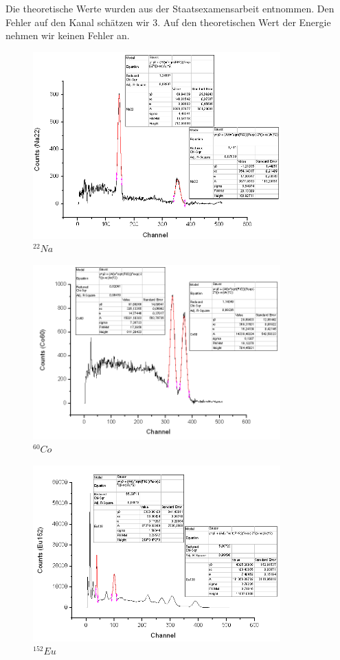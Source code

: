 Die theoretische Werte wurden aus der Staatsexamensarbeit entnommen. Den Fehler auf den Kanal schätzen wir 3. Auf den theoretischen Wert der Energie nehmen wir keinen Fehler an. %

\begin{figure}[H]
\centering \includegraphics[width = 0.85\textwidth]{auswertung/Na22.png}
\caption{$^{22}Na$}
\end{figure}

\begin{figure}[H]
\centering \includegraphics[width = 0.85\textwidth]{auswertung/Co60.png}
\caption{$^{60}Co$}
\end{figure}

\begin{figure}[H]
\centering \includegraphics[width = 0.85\textwidth]{auswertung/Eu152.png}
\caption{$^{152}Eu$}
\end{figure}


